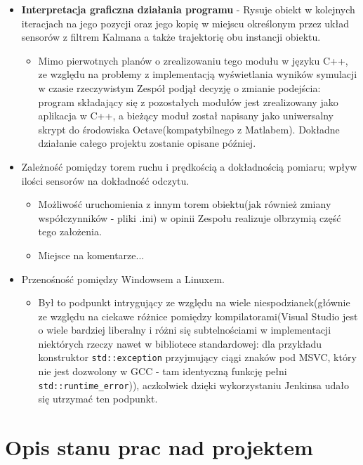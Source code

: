 \documentclass{article}
\begin{document}
\begin{itemize}
		\item \textbf{Interpretacja graficzna działania programu} - Rysuje obiekt w kolejnych iteracjach na jego pozycji oraz jego kopię w miejscu określonym przez układ sensorów z filtrem Kalmana a także trajektorię obu instancji obiektu.
			\begin{itemize}
				\item Mimo pierwotnych planów o zrealizowaniu tego modułu w języku C++, ze względu na problemy z implementacją wyświetlania wyników symulacji w czasie rzeczywistym Zespół podjął decyzję o zmianie podejścia: program składający się z pozostałych modułów jest zrealizowany jako aplikacja w C++, a bieżący moduł został napisany jako uniwersalny skrypt do środowiska Octave(kompatybilnego z Matlabem). Dokładne działanie całego projektu zostanie opisane później.
			\end{itemize}
			
		\item Zależność pomiędzy torem ruchu i prędkością a dokładnością pomiaru; wpływ ilości sensorów na dokładność odczytu. 
			\begin{itemize}
				\item Możliwość uruchomienia z innym torem obiektu(jak również zmiany współczynników - pliki .ini) w opinii Zespołu realizuje olbrzymią część tego założenia.
				\item Miejsce na komentarze... 
			\end{itemize}
		\item Przenośność pomiędzy Windowsem a Linuxem.
			\begin{itemize}
				\item Był to podpunkt intrygujący ze względu na wiele niespodzianek(głównie ze względu na ciekawe różnice pomiędzy kompilatorami(Visual Studio jest o wiele bardziej liberalny i różni się subtelnościami w implementacji niektórych rzeczy nawet w bibliotece standardowej: dla przykładu konstruktor \texttt{std::exception} przyjmujący ciągi znaków pod MSVC, który nie jest dozwolony w GCC - tam identyczną funkcję pełni \texttt{std::runtime\_error})), aczkolwiek dzięki wykorzystaniu Jenkinsa udało się utrzymać ten podpunkt. 
			\end{itemize}
				
		\end{itemize}		
	
	\section{Opis stanu prac nad projektem}
	
\end{document}
